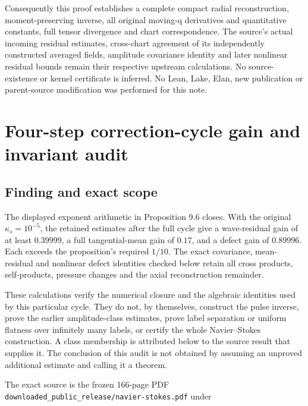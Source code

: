 \documentclass[10pt,a4paper]{article}
\begin{document}
Consequently this proof establishes a complete compact radial reconstruction, moment-preserving inverse, all original moving-q derivatives and quantitative constants, full tensor divergence and chart correspondence. The source's actual incoming residual estimates, cross-chart agreement of its independently constructed averaged fields, amplitude covariance identity and later nonlinear residual bounds remain their respective upstream calculations. No source-existence or kernel certificate is inferred. No Lean, Lake, Elan, new publication or parent-source modification was performed for this note.


\section{Four-step correction-cycle gain and invariant audit}\label{nsupstream:stage_cycle_gain_audit:four-step-correction-cycle-gain-and-invariant-audit}

\subsection{Finding and exact scope}\label{nsupstream:stage_cycle_gain_audit:finding-and-exact-scope}

The displayed exponent arithmetic in Proposition 9.6 closes. With the original \(\kappa_s=10^{-5}\), the retained estimates after the full cycle give a wave-residual gain of at least \(0.39999\), a full tangential-mean gain of \(0.17\), and a defect gain of \(0.89996\). Each exceeds the proposition's required \(1/10\). The exact covariance, mean-residual and nonlinear defect identities checked below retain all cross products, self-products, pressure changes and the axial reconstruction remainder.

These calculations verify the numerical closure and the algebraic identities used by this particular cycle. They do not, by themselves, construct the pulse inverse, prove the earlier amplitude-class estimates, prove label separation or uniform flatness over infinitely many labels, or certify the whole Navier--Stokes construction. A class membership is attributed below to the source result that supplies it. The conclusion of this audit is not obtained by assuming an unproved additional estimate and calling it a theorem.

The exact source is the frozen 166-page PDF \texttt{d\allowbreak{}o\allowbreak{}w\allowbreak{}n\allowbreak{}l\allowbreak{}o\allowbreak{}a\allowbreak{}d\allowbreak{}e\allowbreak{}d\allowbreak{}\_\allowbreak{}p\allowbreak{}u\allowbreak{}b\allowbreak{}l\allowbreak{}i\allowbreak{}c\allowbreak{}\_\allowbreak{}r\allowbreak{}e\allowbreak{}l\allowbreak{}e\allowbreak{}a\allowbreak{}s\allowbreak{}e\allowbreak{}/\allowbreak{}n\allowbreak{}a\allowbreak{}v\allowbreak{}i\allowbreak{}e\allowbreak{}r\allowbreak{}-\allowbreak{}s\allowbreak{}t\allowbreak{}o\allowbreak{}k\allowbreak{}e\allowbreak{}s\allowbreak{}.\allowbreak{}p\allowbreak{}d\allowbreak{}f} under
\end{document}
